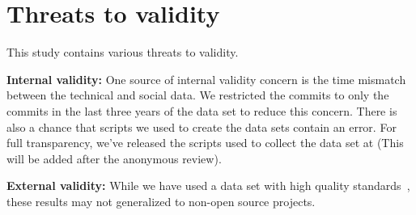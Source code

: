 \documentclass[10pt, conference]{IEEEtran}
\begin{document}
%




\section{Threats to validity}
This study contains various threats to validity.

\noindent\textbf{Internal validity:}
One source of internal validity concern is the time mismatch between the
technical and social data.  We restricted the commits to only the commits in the
last three years of the data set to reduce this concern.
There is also a chance that scripts we used to create the data sets contain an
error.  For full transparency, we've released the scripts used to collect the
data set at (This will be added after the anonymous review).


\noindent\textbf{External validity:} 
While we have used a data set with high quality standards~\cite{msr17challenge},
these results may not generalized to non-open source projects.
\end{document}
